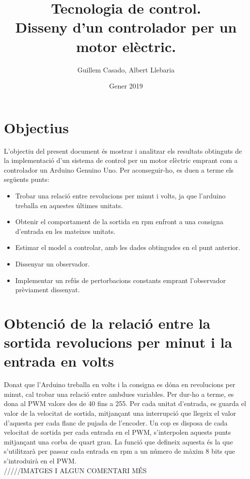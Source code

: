 \documentclass[]{article}
\title{Tecnologia de control. \\ Disseny d'un controlador per un motor elèctric.}
\author{Guillem Casado, Albert Llebaria}
\date{Gener 2019}
\begin{document}
\maketitle


\section{Objectius}

L'objectiu del present document és mostrar i analitzar els resultats obtinguts de la implementació d'un sistema de control per un motor elèctric emprant com a controlador un Arduino Genuino Uno. Per aconseguir-ho, es duen a terme els següents punts: 

\begin{itemize}
	\item Trobar una relació entre revolucions per minut i volts, ja que l'arduino treballa en aquestes últimes unitats.
	\item Obtenir el comportament de la sortida en rpm enfront a una consigna d'entrada en les mateixes unitats. 
	\item Estimar el model a controlar, amb les dades obtingudes en el punt anterior.
	\item Dissenyar un observador.
	\item Implementar un refús de pertorbacions constants emprant l'observador prèviament dissenyat. 
\end{itemize}

\section{Obtenció de la relació entre la sortida revolucions per minut i la entrada en volts}

Donat que l'Arduino treballa en volts i la consigna es dóna en revolucions per minut, cal trobar una relació entre ambdues variables. Per dur-ho a terme, es dona al PWM valors des de 40 fins a 255. Per cada unitat d'entrada, es guarda el valor de la velocitat de sortida, mitjançant una interrupció que llegeix el valor d'aquesta per cada flanc de pujada de l'encoder. Un cop es disposa de cada velocitat de sortida per cada entrada en el PWM, s'interpolen aquests punts mitjançant una corba de quart grau. La funció que defineix aquesta és la que s'utilitzarà per passar cada entrada en rpm a un número de màxim 8 bits que s'introduirà en el PWM. \\

/////IMATGES I ALGUN COMENTARI MÉS
\end{document}
